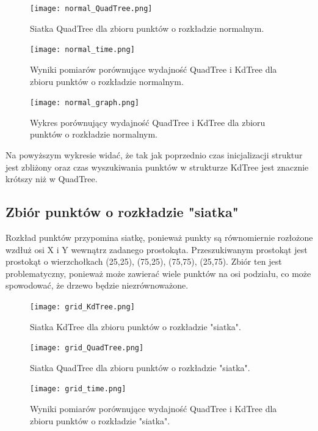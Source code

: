 \documentclass{lab}
\begin{document}
\begin{figure}[H]
  \centering
  \texttt{[image: normal\_QuadTree.png]}
  \caption{Siatka QuadTree dla zbioru punktów o rozkładzie normalnym.}
  \label{fig:normal_QuadTree}
\end{figure}

\begin{figure}[H]
  \centering
  \texttt{[image: normal\_time.png]}
  \caption{Wyniki pomiarów porównujące wydajność QuadTree i KdTree dla zbioru punktów o rozkładzie normalnym.}
  \label{fig:normal_time}
\end{figure}

\begin{figure}[H]
  \centering
  \texttt{[image: normal\_graph.png]}
  \caption{Wykres porównujący wydajność QuadTree i KdTree dla zbioru punktów o rozkładzie normalnym.}
  \label{fig:normal_graph}
\end{figure}

Na powyższym wykresie widać, że tak jak poprzednio czas inicjalizacji struktur jest zbliżony oraz czas wyszukiwania punktów w strukturze KdTree jest znacznie krótszy niż w QuadTree.

\subsection{Zbiór punktów o rozkładzie "siatka"}
Rozkład punktów przypomina siatkę, ponieważ punkty są równomiernie rozłożone wzdłuż osi X i Y wewnątrz zadanego prostokąta.
Przeszukiwanym prostokąt jest prostokąt o wierzchołkach (25,25), (75,25), (75,75), (25,75).
Zbiór ten jest problematyczny, ponieważ może zawierać wiele punktów na osi podziału, co może spowodować, że drzewo będzie niezrównoważone.

\begin{figure}[H]
  \centering
  \texttt{[image: grid\_KdTree.png]}
  \caption{Siatka KdTree dla zbioru punktów o rozkładzie "siatka".}
  \label{fig:grid_KdTree}
\end{figure}

\begin{figure}[H]
  \centering
  \texttt{[image: grid\_QuadTree.png]}
  \caption{Siatka QuadTree dla zbioru punktów o rozkładzie "siatka".}
  \label{fig:grid_QuadTree}
\end{figure}

\begin{figure}[H]
  \centering
  \texttt{[image: grid\_time.png]}
  \caption{Wyniki pomiarów porównujące wydajność QuadTree i KdTree dla zbioru punktów o rozkładzie "siatka".}
  \label{fig:grid_time}
\end{figure}
\end{document}
